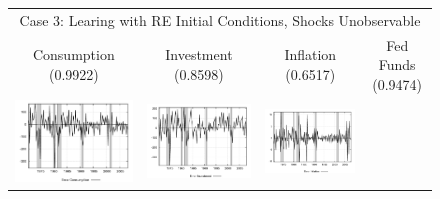 \begin{figure}
\begin{tabular}{cccc}
\multicolumn{4}{c}{Case 3: Learing with RE Initial Conditions, Shocks Unobservable} \\ 
Consumption (0.9922) & Investment (0.8598) & Inflation (0.6517) & Fed Funds (0.9474) \\
\includegraphics[scale=0.22]{results_reinit/consumption_err.png} & 
\includegraphics[scale=0.22]{results_reinit/investment_err.png} & 
\includegraphics[scale=0.22]{results_reinit/inflation_err.png} & 

\end{tabular}
\end{figure}

